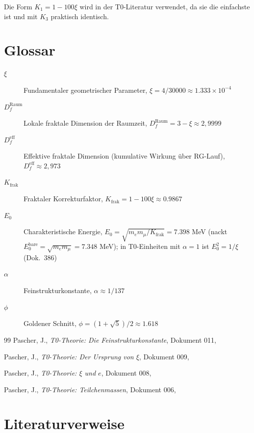 	Die Form $K_1 = 1 - 100\xi$ wird in der T0-Literatur verwendet, da sie die einfachste ist und mit $K_3$ praktisch identisch.
	
	\appendix
	
	\section{Glossar}
	
	\begin{description}
		\item[$\xi$] Fundamentaler geometrischer Parameter, $\xi = 4/30000 \approx 1.333 \times 10^{-4}$
		\item[$D_f^{\text{Raum}}$] Lokale fraktale Dimension der Raumzeit, $D_f^{\text{Raum}} = 3 - \xi \approx 2{,}9999$
		\item[$D_f^{\text{eff}}$] Effektive fraktale Dimension (kumulative Wirkung über RG-Lauf), $D_f^{\text{eff}} \approx 2{,}973$
		\item[$K_{\text{frak}}$] Fraktaler Korrekturfaktor, $K_{\text{frak}} = 1 - 100\xi \approx 0.9867$
		\item[$E_0$] Charakteristische Energie, $E_0 = \sqrt{m_e m_\mu/K_{\text{frak}}} = 7.398$ MeV (nackt $E_0^{\text{bare}} = \sqrt{m_e m_\mu} = 7.348$ MeV); in T0-Einheiten mit $\alpha = 1$ ist $E_0^2 = 1/\xi$ (Dok.~386)
		\item[$\alpha$] Feinstrukturkonstante, $\alpha \approx 1/137$
		\item[$\phi$] Goldener Schnitt, $\phi = (1+\sqrt{5})/2 \approx 1.618$
	\end{description}
	

	
	\begin{thebibliography}{99}
		Pascher, J., \emph{T0-Theorie: Die Feinstrukturkonstante}, Dokument 011, 

		Pascher, J., \emph{T0-Theorie: Der Ursprung von $\xi$}, Dokument 009,

		Pascher, J., \emph{T0-Theorie: $\xi$ und $e$}, Dokument 008,

		Pascher, J., \emph{T0-Theorie: Teilchenmassen}, Dokument 006,
		
	\end{thebibliography}
	
	\section{Literaturverweise}
	
